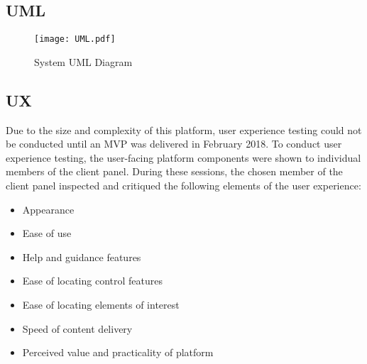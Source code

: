 \subsection{UML}
 
	\begin{figure}[H]
	 	\centering
		\texttt{[image: UML.pdf]}
		\caption{System UML Diagram} 
	 	\label{fig:SystemUML}	
	\end{figure}
    
\subsection{UX}

Due to the size and complexity of this platform, user experience testing could not be conducted until an MVP was delivered in February 2018. To conduct user experience testing, the user-facing platform components were shown to individual members of the client panel. During these sessions, the chosen member of the client panel inspected and critiqued the following elements of the user experience:

\begin{itemize}
	\item Appearance
	\item Ease of use
	\item Help and guidance features
    \item Ease of locating control features 
    \item Ease of locating elements of interest
    \item Speed of content delivery 
    \item Perceived value and practicality of platform
\end{itemize}




